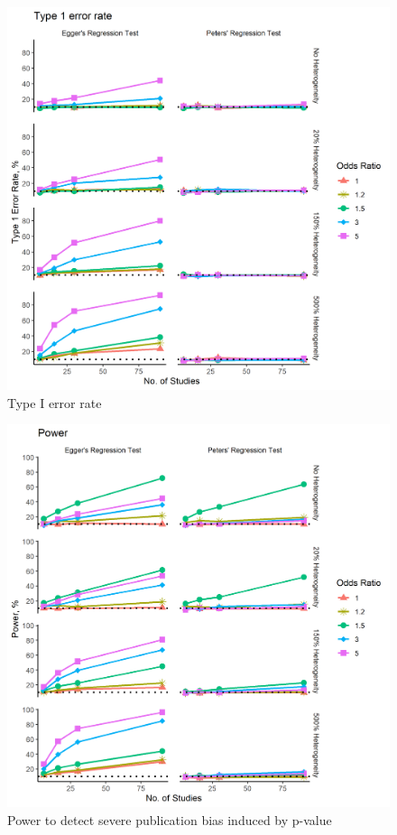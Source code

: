 \documentclass[
  english,
  doc,floatsintext,draftall]{apa6}
\begin{document}
\begin{figure}
\includegraphics[width=400pt]{../figures/type_1_error} \caption{Type I error rate}\label{fig:unnamed-chunk-3}
\end{figure}

\begin{figure}
\includegraphics[width=400pt]{../figures/power_p_severe} \caption{Power to detect severe publication bias induced by p-value}\label{fig:unnamed-chunk-4}
\end{figure}
\end{document}
